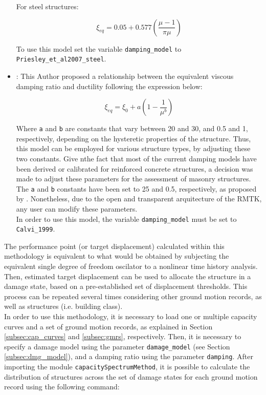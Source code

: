 \begin{itemize}
For steel structures:

\begin{equation}
\xi_{eq} = 0.05 + 0.577\left(\frac{\mu-1}{\pi\mu}\right)
\end{equation}

To use this model set the variable \verb=damping_model= to \verb=Priesley_et_al2007_steel=.\\

\item \cite{Calvi1999}: This Author proposed a relationship between the equivalent viscous damping ratio and ductility following the expression below:

\begin{equation}
\xi_{eq} = \xi_0 + a\left(1-\frac{1}{\mu^b}\right)
\end{equation}

Where \verb=a= and \verb=b= are constants that vary between 20 and 30, and 0.5 and 1, respectively, depending on the hysteretic properties of the structure. Thus, this model can be employed for various structure types, by adjusting these two constants. Give nthe fact that most of the current damping models have been derived or calibrated for reinforced concrete structures, a decision was made to adjust these parameters for the assessment of masonry structures. The \verb=a= and \verb=b= constants have been set to 25 and 0.5, respectively, as proposed by \cite{BorziEtAl2008a}. Nonetheless, due to the open and transparent arquitecture of the RMTK, any user can modify these parameters.\\

In order to use this model, the variable \verb=damping_model= must be set to \verb=Calvi_1999=.\\

\end{itemize}
The performance point (or target displacement) calculated within this methodology is equivalent to what would be obtained by subjecting the equivalent single degree of freedom oscilator to a nonlinear time history analysis. Then, estimated target displacement can be used to allocate the structure in a damage state, based on a pre-established set of displacement thresholds. This process can be repeated several times considering other ground motion records, as well as structures (i.e. building class).\\

In order to use this methodology, it is necessary to load one or multiple capacity curves and a set of ground motion records, as explained in Section \ref{subsec:cap_curves} and \ref{subsec:gmrs}, respectively. Then, it is necessary to specify a damage model using the parameter \verb=damage_model= (see Section \ref{subsec:dmg_model}), and a damping ratio using the parameter \verb=damping=. After importing the module \verb=capacitySpectrumMethod=, it is possible to calculate the distribution of structures across the set of damage states for each ground motion record using the following command:

